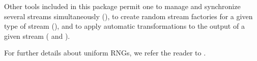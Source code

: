 Other tools included in this package permit one to manage
and synchronize several streams simultaneously 
(),
to create random stream factories for a given type of stream
(),
and to apply automatic transformations to the output of a given
stream ( and 
).

For further details about uniform RNGs, we refer the reader to
\cite{rKNU98a,rLEC01d,rLEC04b}.


